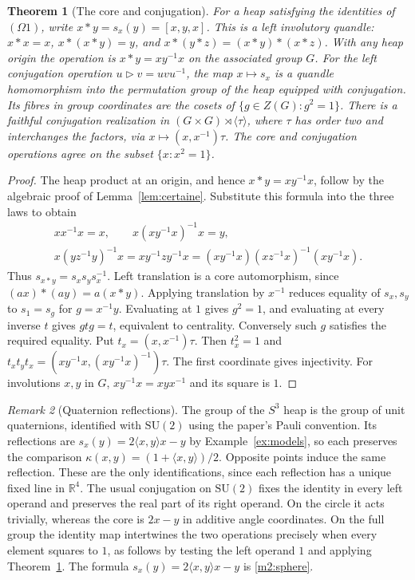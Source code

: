 \documentclass[11pt,reqno]{amsart}
\newtheorem{theorem}{Theorem}[section]
\theoremstyle{definition}
\theoremstyle{remark}
\newtheorem{remark}[theorem]{Remark}
\numberwithin{equation}{section}
\newcommand{\R}{\mathbb{R}}
\newcommand{\ip}[2]{\langle #1,#2\rangle}
\newcommand{\hp}[3]{[#1,#2,#3]}
\newcommand{\SU}{\mathrm{SU}}
\begin{document}
\begin{theorem}[The core and conjugation]\label{m7:core}
For a heap satisfying the identities of $(\Omega1)$, write
$x*y=s_x(y)=\hp xyx$. This is a left involutory quandle:
$x*x=x$, $x*(x*y)=y$, and $x*(y*z)=(x*y)*(x*z)$.
With any heap origin the operation is $x*y=xy^{-1}x$ on the associated
group $G$. For the left conjugation operation $u\triangleright v=uvu^{-1}$,
the map $x\mapsto s_x$ is a quandle homomorphism into the permutation group
of the heap equipped with conjugation. Its fibres in group coordinates
are the cosets of $\{g\in Z(G):g^2=1\}$. There is a faithful conjugation
realization in $(G\times G)\rtimes\langle\tau\rangle$, where $\tau$ has order
two and interchanges the factors, via $x\mapsto(x,x^{-1})\tau$.
The core and conjugation operations agree on the subset $\{x:x^2=1\}$.
\end{theorem}
\begin{proof}
The heap product at an origin, and hence $x*y=xy^{-1}x$, follow by the
algebraic proof of Lemma~\ref{lem:certaine}. Substitute this formula
into the three laws to obtain
\[
\begin{gathered}
 xx^{-1}x=x,\qquad x(xy^{-1}x)^{-1}x=y,\\
 x(yz^{-1}y)^{-1}x=xy^{-1}zy^{-1}x
  =(xy^{-1}x)(xz^{-1}x)^{-1}(xy^{-1}x).
\end{gathered}
\]
Thus $s_{x*y}=s_xs_ys_x^{-1}$. Left translation is a core automorphism, since
$(ax)*(ay)=a(x*y)$. Applying translation by $x^{-1}$ reduces equality of
$s_x,s_y$ to $s_1=s_g$ for $g=x^{-1}y$. Evaluating at $1$ gives $g^2=1$,
and evaluating at every inverse $t$ gives $gtg=t$, equivalent to centrality.
Conversely such $g$ satisfies the required equality. Put $t_x=(x,x^{-1})\tau$.
Then $t_x^2=1$ and $t_xt_yt_x=(xy^{-1}x,(xy^{-1}x)^{-1})\tau$.
The first coordinate gives injectivity. For involutions $x,y$ in $G$,
$xy^{-1}x=xyx^{-1}$ and its square is $1$.
\end{proof}

\begin{remark}[Quaternion reflections]\label{m7:reflection}
The group of the $S^3$ heap is the group of unit quaternions, identified
with $\SU(2)$ using the paper's Pauli convention. Its reflections are
$s_x(y)=2\ip xyx-y$ by Example~\ref{ex:models}, so each preserves the
comparison $\kappa(x,y)=(1+\ip xy)/2$. Opposite points induce the same
reflection. These are the only identifications, since each reflection has
a unique fixed line in $\R^4$. The usual conjugation on $\SU(2)$ fixes the
identity in every left operand and preserves the real part of its right
operand. On the circle it acts trivially, whereas the core is $2x-y$ in
additive angle coordinates. On the full group the identity map intertwines
the two operations precisely when every element squares to $1$, as follows
by testing the left operand $1$ and applying Theorem~\ref{m7:core}.  The formula $s_x(y)=2\ip xyx-y$ is \eqref{m2:sphere}.
\end{remark}
\end{document}
